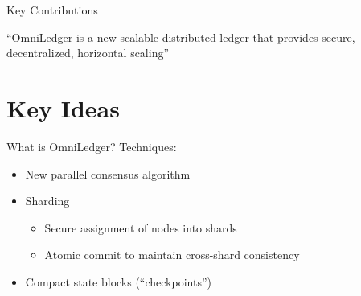 \begin{frame}{Key Contributions}
    \centering
    \begin{minipage}{.52\textwidth}
    \end{minipage}\hfill%
    \begin{minipage}{.44\textwidth}
        ``OmniLedger is a new \alert{scalable} distributed ledger that provides \alert{secure}, \alert{decentralized}, \alert{horizontal} \alert{scaling}''
    \end{minipage}
\end{frame}
\note{
    \begin{itemize}
        \item
    \end{itemize}
}

\section{Key Ideas}

\begin{frame}{What is OmniLedger?}
    Techniques:
    \begin{itemize}
        \item New parallel consensus algorithm
        \item Sharding
            \begin{itemize}
                \item Secure assignment of nodes into shards
                \item Atomic commit to maintain cross-shard consistency
            \end{itemize}
        \item Compact state blocks (``checkpoints'')
    \end{itemize}
\end{frame}


